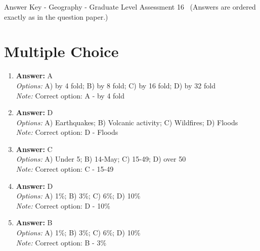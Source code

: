 \documentclass[12pt]{article}
\begin{document}
\begin{center}
Answer Key - Geography - Graduate Level Assessment 16 \
\small (Answers are ordered exactly as in the question paper.)
\end{center}

\section*{Multiple Choice}
\begin{enumerate}[label=\arabic*.]
\item \textbf{Answer:} A
\\ \textit{Options:} A) by 4 fold; B) by 8 fold; C) by 16 fold; D) by 32 fold
\\ \textit{Note:} Correct option: A - by 4 fold
\item \textbf{Answer:} D
\\ \textit{Options:} A) Earthquakes; B) Volcanic activity; C) Wildfires; D) Floods
\\ \textit{Note:} Correct option: D - Floods
\item \textbf{Answer:} C
\\ \textit{Options:} A) Under 5; B) 14-May; C) 15-49; D) over 50
\\ \textit{Note:} Correct option: C - 15-49
\item \textbf{Answer:} D
\\ \textit{Options:} A) 1\%; B) 3\%; C) 6\%; D) 10\%
\\ \textit{Note:} Correct option: D - 10\%
\item \textbf{Answer:} B
\\ \textit{Options:} A) 1\%; B) 3\%; C) 6\%; D) 10\%
\\ \textit{Note:} Correct option: B - 3\%
\end{enumerate}
\end{document}
